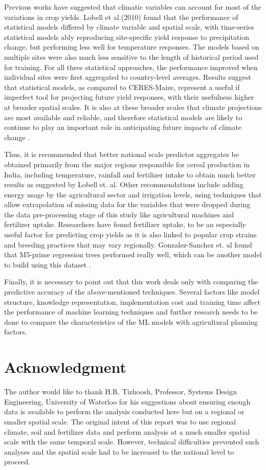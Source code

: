 \documentclass[conference]{IEEEtran}
\begin{document}
Previous works have suggested that climatic variables can account for most of the variations in crop yields. Lobell et al.(2010) found that the performance of statistical models differed by climate variable and spatial scale, with time-series statistical models ably reproducing site-specific yield response to precipitation change, but performing less well for temperature responses. The models based on multiple sites were also much less sensitive to the length of historical period used for training. For all three statistical approaches, the performance improved when individual sites were first aggregated to country-level averages. Results suggest that statistical models, as compared to CERES-Maize, represent a useful if imperfect tool for projecting future yield responses, with their usefulness higher at broader spatial scales. It is also at these broader scales that climate projections are most available and reliable, and therefore statistical models are likely to continue to play an important role in anticipating future impacts of climate change \cite{Lobell2010}.

Thus, it is recommended that better national scale predictor aggregates be obtained primarily from the major regions responsible for cereal production in India, including temperature, rainfall and fertilizer intake to obtain much better results as suggested by Lobell et. al. Other recommendations include adding energy usage by the agricultural sector and irrigation levels, using techniques that allow extrapolation of missing data for the variables that were dropped during the data pre-processing stage of this study like agricultural machines and fertilizer uptake. Researchers have found fertilizer uptake, to be an especially useful factor for predicting crop yields as it is also linked to popular crop strains and breeding practices that may vary regionally. Gonzalez-Sanchez et. al found that M5-prime regression trees performed really well, which can be another model to build using this dataset \cite{Gonzalez-Sanchez2014}.

Finally, it is necessary to point out that this work deals only with comparing the predictive accuracy of the above-mentioned techniques. Several factors like model structure, knowledge representation, implementation cost and training time affect the performance of machine learning techniques and further research needs to be done to compare the characteristics of the ML models with agricultural planning factors.

\section*{Acknowledgment}
The author would like to thank H.R. Tizhoosh, Professor, Systems Design Engineering, University of Waterloo for his suggestions about ensuring enough data is available to perform the analysis conducted here but on a regional or smaller spatial scale. The original intent of this report was to use regional climate, soil and fertilizer data and perform analysis at a much smaller spatial scale with the same temporal scale. However, technical difficulties prevented such analyses and the spatial scale had to be increased to the national level to proceed.




\end{document}
